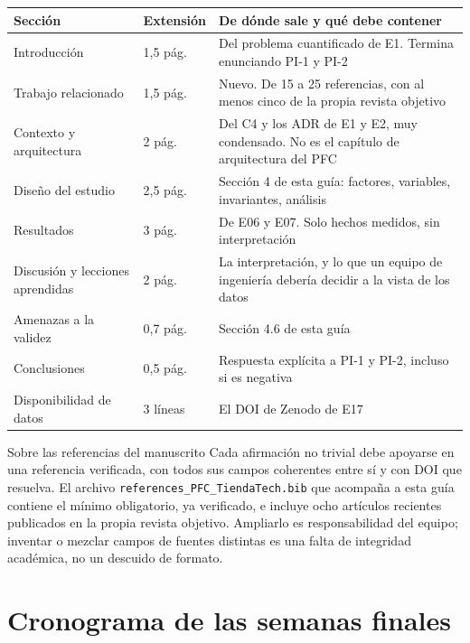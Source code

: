 \documentclass[11pt,a4paper]{article}
\begin{document}
\begin{center}
	\small
	\begin{tabular}{@{}p{3.8cm}p{1.7cm}p{9.3cm}@{}}
		\toprule
		\textbf{Sección} & \textbf{Extensión} & \textbf{De dónde sale y qué debe contener} \\
		\midrule
		Introducción & 1,5 pág. & Del problema cuantificado de E1. Termina enunciando PI-1 y PI-2 \\
		\addlinespace
		Trabajo relacionado & 1,5 pág. & Nuevo. De 15 a 25 referencias, con al menos cinco de la propia revista objetivo \\
		\addlinespace
		Contexto y arquitectura & 2 pág. & Del C4 y los ADR de E1 y E2, muy condensado. No es el capítulo de arquitectura del PFC \\
		\addlinespace
		Diseño del estudio & 2,5 pág. & Sección 4 de esta guía: factores, variables, invariantes, análisis \\
		\addlinespace
		Resultados & 3 pág. & De E06 y E07. Solo hechos medidos, sin interpretación \\
		\addlinespace
		Discusión y lecciones aprendidas & 2 pág. & La interpretación, y lo que un equipo de ingeniería debería decidir a la vista de los datos \\
		\addlinespace
		Amenazas a la validez & 0,7 pág. & Sección 4.6 de esta guía \\
		\addlinespace
		Conclusiones & 0,5 pág. & Respuesta explícita a PI-1 y PI-2, incluso si es negativa \\
		\addlinespace
		Disponibilidad de datos & 3 líneas & El DOI de Zenodo de E17 \\
		\bottomrule
	\end{tabular}
\end{center}

\begin{aviso}{Sobre las referencias del manuscrito}
	Cada afirmación no trivial debe apoyarse en una referencia verificada, con todos sus campos coherentes entre sí y con DOI que resuelva. El archivo \texttt{references\_PFC\_TiendaTech.bib} que acompaña a esta guía contiene el mínimo obligatorio, ya verificado, e incluye ocho artículos recientes publicados en la propia revista objetivo. Ampliarlo es responsabilidad del equipo; inventar o mezclar campos de fuentes distintas es una falta de integridad académica, no un descuido de formato.
\end{aviso}

\section{Cronograma de las semanas finales}
\end{document}

